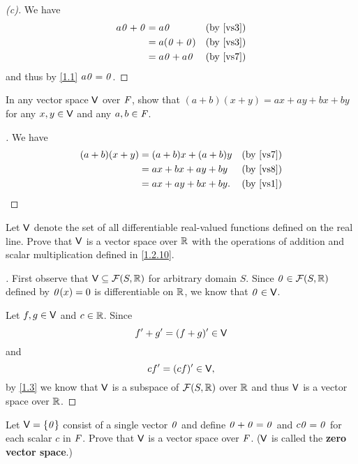 \begin{proof}[(c)]
	We have
	\begin{align*}
		a\mathit{0} + \mathit{0} & = a\mathit{0}         &  & \text{(by \ref{vs3})} \\
		           & = a(\mathit{0} + \mathit{0}) &  & \text{(by \ref{vs3})} \\
		           & = a\mathit{0} + a\mathit{0}  &  & \text{(by \ref{vs7})}
	\end{align*}
	and thus by \cref{1.1} \(a\mathit{0} = \mathit{0}\).
\end{proof}

\exercisesection

\setcounter{ex}{7}
\begin{ex}\label{ex:1.2.8}
	In any vector space \(\mathsf{V}\) over \(\mathit{F}\), show that \((a + b)(x + y) = ax + ay + bx + by\) for any \(x, y \in \mathsf{V}\) and any \(a, b \in \mathit{F}\).
\end{ex}

\begin{proof}[]
	We have
	\begin{align*}
		(a + b)(x + y) & = (a + b) x + (a + b) y &  & \text{(by \ref{vs7})} \\
		               & = ax + bx + ay + by     &  & \text{(by \ref{vs8})} \\
		               & = ax + ay + bx + by.    &  & \text{(by \ref{vs1})}
	\end{align*}
\end{proof}

\setcounter{ex}{9}
\begin{ex}\label{ex:1.2.10}
	Let \(\mathsf{V}\) denote the set of all differentiable real-valued functions defined on the real line.
	Prove that \(\mathsf{V}\) is a vector space over \(\mathbb{R}\) with the operations of addition and scalar multiplication defined in \cref{1.2.10}.
\end{ex}

\begin{proof}[]
	First observe that \(\V \subseteq \fs{S}{\R}\) for arbitrary domain \(S\).
	Since \(\zv \in \fs{S}{\R}\) defined by \(\mathit{0}(x) = 0\) is differentiable on \(\mathbb{R}\), we know that \(\mathit{0} \in \mathsf{V}\).

	Let \(f, g \in \mathsf{V}\) and \(c \in \mathbb{R}\).
	Since
	\[
		f' + g' = (f + g)' \in \mathsf{V}
	\]
	and
	\[
		cf' = (cf)' \in \mathsf{V},
	\]
	by \cref{1.3} we know that \(\mathsf{V}\) is a subspace of \(\fs{S}{\R}\) over \(\mathbb{R}\) and thus \(\mathsf{V}\) is a vector space over \(\mathbb{R}\).
\end{proof}

\begin{ex}\label{ex:1.2.11}
	Let \(\mathsf{V} = \left\lbrace\mathit{0}\right\rbrace\) consist of a single vector \(\mathit{0}\) and define \(\mathit{0} + \mathit{0} = \mathit{0}\) and \(c\mathit{0} = \mathit{0}\) for each scalar \(c\) in \(\mathit{F}\).
	Prove that \(\mathsf{V}\) is a vector space over \(\mathit{F}\).
	(\(\mathsf{V}\) is called the \textbf{zero vector space}.)
\end{ex}

